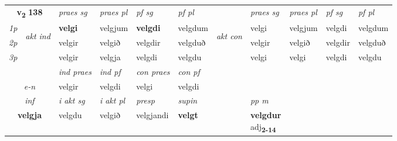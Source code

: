 \noindent
\begin{tabular}{lllllllllll} \toprule
\multicolumn{2}{c}{\textbf{v{\textsubscript{2}}} \Large{\textbf{138}}}  &  \textit{praes sg}  & \textit{praes pl}  &\textit{ pf sg} & \textit{pf pl} &  &  \textit{praes sg}  & \textit{praes pl}  & \textit{pf sg} & \textit{pf pl } \\*
	\cmidrule{3-6} \cmidrule{8-11}
 {\textit{1p}} & \multirow{3}{*}{\begin{turn}{90}\textit{akt ind}\end{turn}} & \textbf{velgi} & velgjum & \textbf{velgdi} & velgdum & \multirow{3}{*}{\begin{turn}{90}\textit{akt con}\end{turn}} &velgi & velgjum & velgdi & velgdum\\*
 {\textit{2p}} &  &  velgir  & velgið & velgdir & velgduð & & velgir & velgið & velgdir & velgduð \\*
{\textit{3p}} &  & velgir & velgja & velgdi & velgdu & & velgi & velgi& velgdi & velgdu \\*
\cmidrule{3-6} \cmidrule{8-11}

   & &  \textit{ind praes} & \textit{ind pf} & \textit{con praes} & \textit{con pf} \\*
\multicolumn{2}{c}{ \textit{e-n} } & velgir & velgdi & velgi & velgdi \\*

\cmidrule{3-8}
   \multicolumn{2}{c}{\textit{inf}}  & \textit{i akt sg} & \textit{i akt pl}   & \textit{presp} & \textit{supin}  && \textit{pp m} \\*
  \multicolumn{2}{c}{\textbf{velgja}} & velgdu  & velgið   & velgjandi &  \textbf{velgt}  && \specialcell{\textbf{velgdur} \\ adj\textbf{\textsubscript{2-14}}} \\*
\end{tabular}

